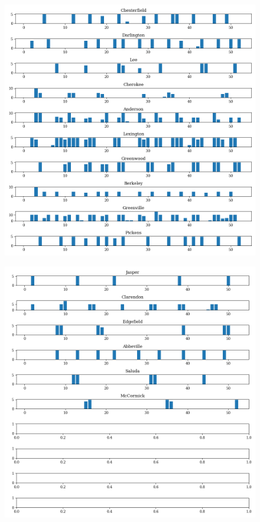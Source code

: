 \documentclass[11pt]{article}
\begin{document}
  \begin{figure}[H]
    \centering
    \includegraphics[width=\textwidth]{../../../output/figures/Exploration/County_weekly_judge_days_3}
  \end{figure}

  \begin{figure}[H]
    \centering
    \includegraphics[width=\textwidth]{../../../output/figures/Exploration/County_weekly_judge_days_4}
  \end{figure}
\end{document}
